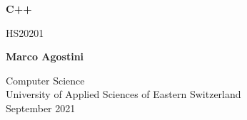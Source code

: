 \begin{titlepage}
    \begin{center}
        \vspace*{1cm}
            
        \Huge
        \textbf{C++}
            
        \vspace{0.5cm}
        \LARGE
        HS20201
            
        \vspace{1.5cm}
            
        \textbf{Marco Agostini}
            
        \vfill
            
            
        \vspace{0.8cm}
            
            
        \Large
        Computer Science\\
        University of Applied Sciences of Eastern Switzerland\\
        September 2021
        

    \end{center}
\end{titlepage}

\tableofcontents
